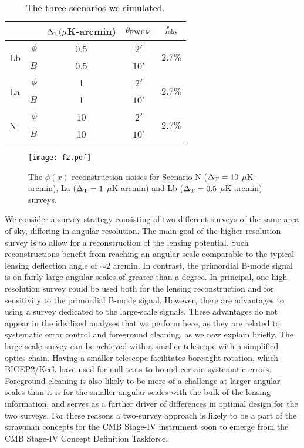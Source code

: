 \documentclass[aps, prd, reprint, nofootinbib, groupedaddress, showpacs]{revtex4-1}
\begin{document}
\begin{table}
\scalebox{1.3} {
\begin{tabular}{ l r|c| c |c}
     &  & $\Delta_{\rm T} (\mu$K-arcmin) & $\theta_{\rm FWHM}$ & $f_{\rm sky}$ \\ \hline
    \multirow{2}{*}{Lb}  &  $\phi$ & 0.5  & $2'$ & \multirow{2}{*}{$2.7\%$}\\ \cline{2-4}
                         &  $B$    & 0.5 & $10'$ & \\ \hline
    \multirow{2}{*}{La}  &  $\phi$ & 1  & $2'$ & \multirow{2}{*}{$2.7\%$}\\ \cline{2-4}
                        &  $B$    & 1 & $10'$ & \\ \hline
    \multirow{2}{*}{N}  &  $\phi$ & 10  & $2'$  & \multirow{2}{*}{$2.7\%$} \\ \cline{2-4}
                        &  $B$ & 10 & $10'$ & \\ \hline
\end{tabular}
}
\caption{The three scenarios we simulated.}
\label{table}
\end{table}

\begin{figure}
\centering
\texttt{[image: f2.pdf]}
\caption{ \label{fig:phi_noise}
The $\phi(x)$ reconstruction noises for Scenario N ($\Delta_{\rm T} = 10$ $\mu$K-arcmin), La
($\Delta_{\rm T} = 1$ $\mu$K-arcmin) and Lb ($\Delta_{\rm T} = 0.5$ $\mu$K-arcmin) surveys.}
\end{figure}

We consider a survey strategy consisting of two different surveys of the same area of sky, differing
in angular resolution. The main goal of the higher-resolution survey is to allow for a reconstruction of
the lensing potential. Such reconstructions benefit from reaching an angular scale comparable to the typical
lensing deflection angle of $\sim 2$ arcmin. In contrast, the primordial B-mode signal is on fairly large angular scales of
greater than a degree. In principal, one high-resolution survey could be used both for the lensing reconstruction
and for sensitivity to the primordial B-mode signal. However, there are advantages to using a survey dedicated
to the large-scale signals. These advantages do not appear in the idealized analyses that we perform here,
as they are related to systematic error control and foreground cleaning, as we now explain briefly.
The large-scale survey can be achieved with a smaller telescope with a simplified optics chain.
Having a smaller telescope facilitates boresight rotation, which BICEP2/Keck have used for null
tests to bound certain systematic errors. Foreground cleaning is also likely to be more of a challenge
at larger angular scales than it is for the smaller-angular scales with the bulk of the lensing information,
and serves as a further driver of differences in optimal design for the two surveys.
For these reasons a two-survey approach is likely to be a part of the strawman concepts for
the CMB Stage-IV instrument soon to emerge from the CMB Stage-IV Concept Definition Taskforce.
\end{document}
